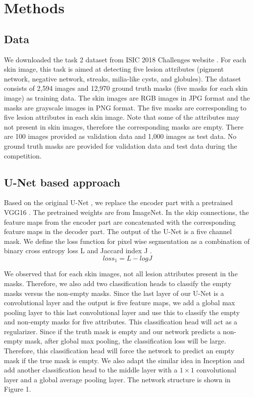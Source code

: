 \documentclass{article}
\begin{document}
\section{Methods}


\subsection{Data}
We downloaded the task 2 dataset from ISIC 2018 Challenges website \citep{Tschandl2018_HAM10000}. For each skin image, this task is aimed at detecting five lesion attributes (pigment network, negative network, streaks, milia-like cysts, and globules). The dataset consists of 2,594 images and 12,970 ground truth masks (five masks for each skin image) as training data. The skin images are RGB images in JPG format and the masks are grayscale images in PNG format. The five masks are corresponding to five lesion attributes in each skin image. Note that some of the attributes may not present in skin images, therefore the corresponding masks are empty. There are 100 images provided as validation data and 1,000 images as test data.  No ground truth masks are provided for validation data and test data during the competition. 

\subsection{U-Net based approach}
Based on the original U-Net \citep{ronneberger2015u}, we replace the encoder part with a pretrained VGG16 \citep{iglovikov2018ternausnetv2}. The pretrained weights are from ImageNet. In the skip connections, the feature maps from the encoder part are concatenated with the corresponding feature maps in the decoder part. The output of the U-Net is a five channel mask. We define the loss function for pixel wise segmentation as a combination of binary cross entropy loss L and Jaccard index J \citep{shvets2018automatic}. 
\begin{equation}
loss_1 = L - log J
\end{equation}

We observed that for each skin images, not all lesion attributes present in the masks. Therefore, we also add two classification heads to classify the empty masks versus the non-empty masks. Since the last layer of our U-Net is a convolutional layer and the output is five feature maps, we add a global max pooling layer to this last convolutional layer and use this to classify the empty and non-empty masks for five attributes.  This classification head will act as a regularizer. Since if the truth mask is empty and our network predicts a non-empty mask, after global max pooling, the classification loss will be large. Therefore, this classification head will force the network to predict an empty mask if the true mask is empty.  We also adapt the similar idea in Inception \citep{szegedy2017inception} and add another classification head to the middle layer with a $1\times1$ convolutional layer and a global average pooling layer. The network structure is shown in Figure 1.
\end{document}
